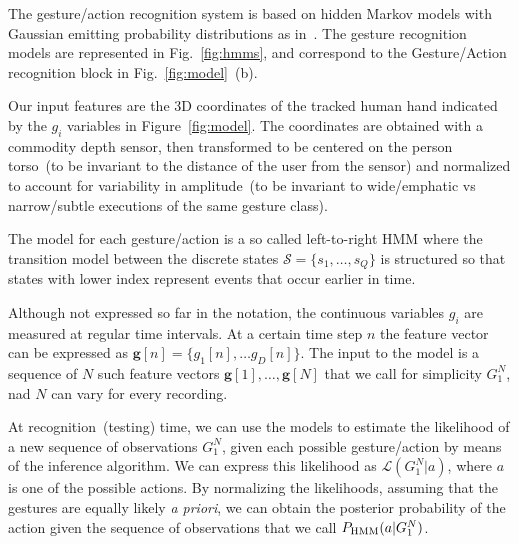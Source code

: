 The gesture/action recognition system is based on hidden Markov models with Gaussian emitting probability distributions as in~\cite{saponaro:2013:crhri}.
The gesture recognition models are represented in Fig.~\ref{fig:hmms}, and correspond to the Gesture/Action recognition block in Fig.~\ref{fig:model}~(b).

Our input features are the 3D coordinates of the tracked human hand indicated by the $g_i$ variables in Figure~\ref{fig:model}.
The coordinates are obtained with a commodity depth sensor, then transformed to be centered on the person torso~(to be invariant to the distance of the user from the sensor) and normalized to account for variability in amplitude~(to be invariant to wide/emphatic vs narrow/subtle executions of the same gesture class).

The model for each gesture/action is a so called left-to-right \ac{HMM} where the transition model between the discrete states $\mathcal{S} = \{s_1, \dots, s_Q\}$ is structured so that states with lower index represent events that occur earlier in time.

Although not expressed so far in the notation, the continuous variables $g_i$ are measured at regular time intervals.
At a certain time step $n$ the feature vector can be expressed as $\mathbf{g}[n] = \{g_1[n], \dots g_D[n]\}$.
The input to the model is a sequence of $N$ such feature vectors $\mathbf{g}[1], \dots, \mathbf{g}[N]$ that we call for simplicity $G_1^N$, nad $N$ can vary for every recording.

At recognition~(testing) time, we can use the models to estimate the likelihood of a new sequence of observations $G_1^N$, given each possible gesture/action by means of the \FB{} inference algorithm.
We can express this likelihood as $\mathcal{L}(G_1^N|a)$, where $a$ is one of the possible actions.
By normalizing the likelihoods, assuming that the gestures are equally likely \emph{a priori}, we can obtain the posterior probability of the action given the sequence of observations that we call $P_{\text{HMM}}(a|G_1^N)$.

